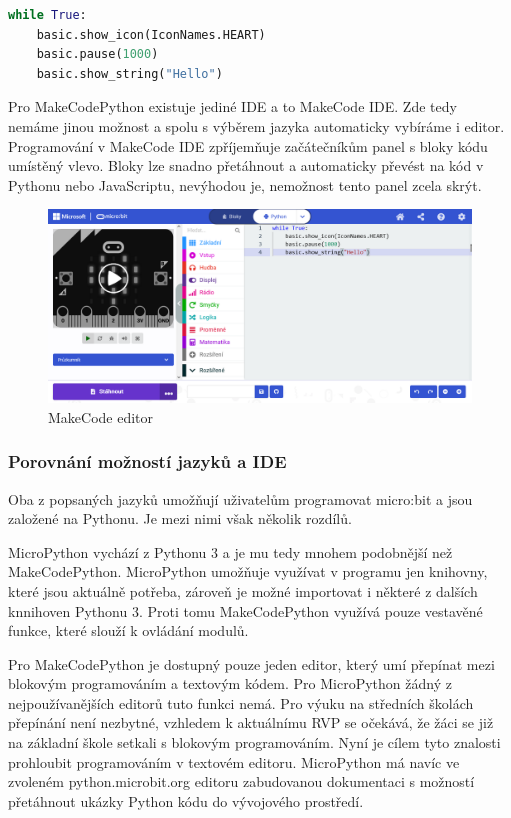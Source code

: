 \documentclass[
  digital,     %
  oneside,     %
  nosansbold,  %
  colorbold, %
  lof,         %
  nolot,         %
]{fithesis4}
\begin{document}
\begin{lstlisting}[language=Python, caption=MakeCode Python ukázka]
while True:
    basic.show_icon(IconNames.HEART)
    basic.pause(1000)
    basic.show_string("Hello")
\end{lstlisting}

Pro MakeCodePython existuje jediné IDE a to MakeCode IDE. Zde tedy nemáme jinou možnost a spolu s výběrem jazyka automaticky vybíráme i editor. Programování v MakeCode IDE zpříjemňuje začátečníkům panel s bloky kódu umístěný vlevo. Bloky lze snadno přetáhnout a automaticky převést na kód v Pythonu nebo JavaScriptu, nevýhodou je, nemožnost tento panel zcela skrýt.

\begin{figure}[ht]
    \centering
    \includegraphics[width=\textwidth]  {images/makecodeE.png}
    \caption{MakeCode editor}
\end{figure}

\subsubsection{Porovnání možností jazyků a IDE} 
Oba z popsaných jazyků umožňují uživatelům programovat micro:bit a jsou založené na Pythonu. Je mezi nimi však několik rozdílů.

MicroPython vychází z Pythonu 3 a je mu tedy mnohem podobnější než MakeCodePython. MicroPython umožňuje využívat v programu jen knihovny, které jsou aktuálně potřeba, zároveň je možné importovat i některé z dalších knnihoven Pythonu 3. Proti tomu MakeCodePython využívá pouze vestavěné funkce, které slouží k ovládání modulů.

Pro MakeCodePython je dostupný pouze jeden editor, který umí přepínat mezi blokovým programováním a textovým kódem. Pro MicroPython žádný z nejpoužívanějších editorů tuto funkci nemá. Pro výuku na středních školách  přepínání není nezbytné, vzhledem k aktuálnímu RVP se očekává, že žáci se již na základní škole setkali s blokovým programováním. Nyní je cílem tyto znalosti prohloubit programováním v textovém editoru.  MicroPython má navíc ve zvoleném python.microbit.org editoru zabudovanou dokumentaci s možností přetáhnout ukázky Python kódu do vývojového prostředí.
\end{document}
